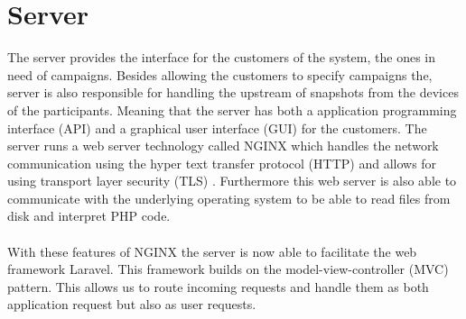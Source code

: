 \section{Server}
\label{sec:server}

The server provides the interface for the customers of the system, the ones in need of campaigns. Besides allowing the customers to specify campaigns the, server is also responsible for handling the upstream of snapshots from the devices of the participants. Meaning that the server has both a application programming interface (API)  and a graphical user interface (GUI)  for the customers. The server runs a web server technology called NGINX which handles the network communication using the hyper text transfer protocol (HTTP)  and allows for using transport layer security (TLS) . Furthermore this web server is also able to communicate with the underlying operating system to be able to read files from disk and interpret PHP code.
\\\\
With these features of NGINX the server is now able to facilitate the web framework Laravel. This framework builds on the model-view-controller (MVC) pattern. This allows us to route incoming requests and handle them as both application request but also as user requests. 

